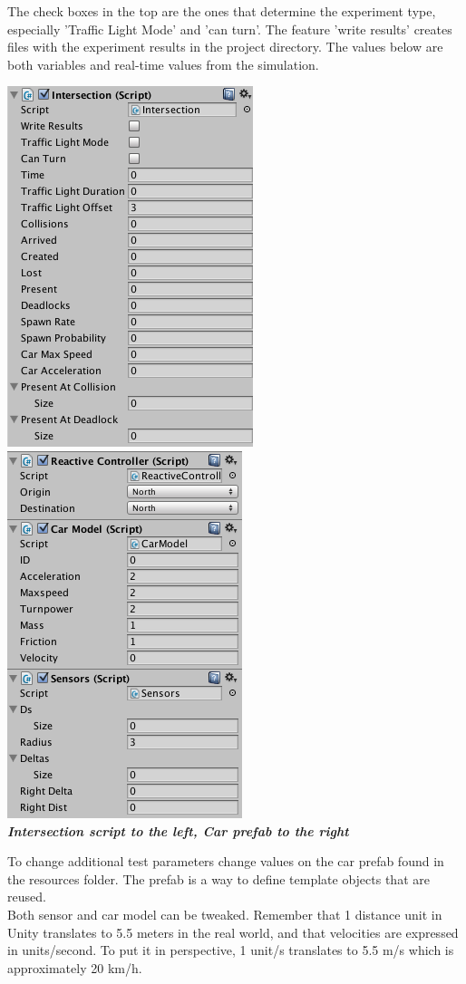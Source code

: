 \noindent
The check boxes in the top are the ones that determine the experiment type, especially 'Traffic Light Mode' and 'can turn'. The feature 'write results' creates files with the experiment results in the project directory.
The values below are both variables and real-time values from the simulation.\\

\begin{center}
\includegraphics[scale=.5]{img/intersection-panel}
\includegraphics[scale=.5]{img/car-prefab}\\
\textit{\textbf{Intersection script to the left, Car prefab to the right}}
\end{center}

\noindent
To change additional test parameters change values on the car prefab found in the resources folder. The prefab is a way to define template objects that are reused.\\

\noindent
Both sensor and car model can be tweaked. Remember that 1 distance unit in Unity translates to 5.5 meters in the real world, and that velocities are expressed in units/second.
To put it in perspective, 1 unit/s translates to 5.5 m/s which is approximately 20 km/h.
